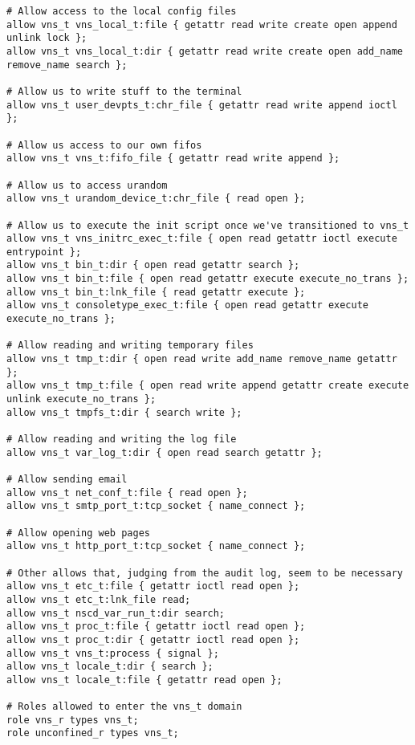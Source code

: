 \documentclass[a4paper,12pt]{report}
\begin{document}
\begin{verbatim}
# Allow access to the local config files
allow vns_t vns_local_t:file { getattr read write create open append unlink lock };
allow vns_t vns_local_t:dir { getattr read write create open add_name remove_name search };

# Allow us to write stuff to the terminal
allow vns_t user_devpts_t:chr_file { getattr read write append ioctl };

# Allow us access to our own fifos
allow vns_t vns_t:fifo_file { getattr read write append };

# Allow us to access urandom
allow vns_t urandom_device_t:chr_file { read open };

# Allow us to execute the init script once we've transitioned to vns_t
allow vns_t vns_initrc_exec_t:file { open read getattr ioctl execute entrypoint };
allow vns_t bin_t:dir { open read getattr search };
allow vns_t bin_t:file { open read getattr execute execute_no_trans };
allow vns_t bin_t:lnk_file { read getattr execute };
allow vns_t consoletype_exec_t:file { open read getattr execute execute_no_trans };

# Allow reading and writing temporary files
allow vns_t tmp_t:dir { open read write add_name remove_name getattr };
allow vns_t tmp_t:file { open read write append getattr create execute unlink execute_no_trans };
allow vns_t tmpfs_t:dir { search write };

# Allow reading and writing the log file
allow vns_t var_log_t:dir { open read search getattr };

# Allow sending email
allow vns_t net_conf_t:file { read open };
allow vns_t smtp_port_t:tcp_socket { name_connect };

# Allow opening web pages
allow vns_t http_port_t:tcp_socket { name_connect };

# Other allows that, judging from the audit log, seem to be necessary
allow vns_t etc_t:file { getattr ioctl read open };
allow vns_t etc_t:lnk_file read;
allow vns_t nscd_var_run_t:dir search;
allow vns_t proc_t:file { getattr ioctl read open };
allow vns_t proc_t:dir { getattr ioctl read open };
allow vns_t vns_t:process { signal };
allow vns_t locale_t:dir { search };
allow vns_t locale_t:file { getattr read open };

# Roles allowed to enter the vns_t domain
role vns_r types vns_t;
role unconfined_r types vns_t;
\end{verbatim}
\end{document}
